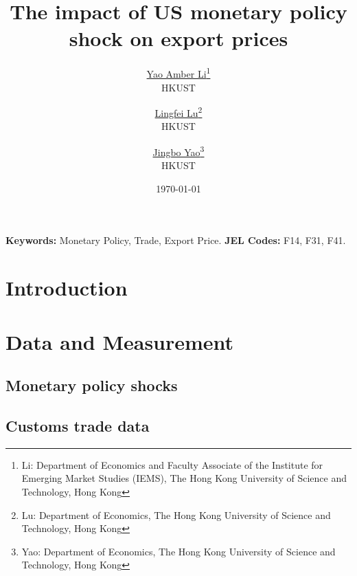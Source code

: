 

\linespread{1.2}
\geometry{a4paper,scale=0.75}
\setlength{\parskip}{0.5em}




\title{\Large \textbf{The impact of US monetary policy shock on export prices}}

\author{\large \href{http://yaoli.people.ust.hk/}{Yao Amber Li}\thanks{Li: Department of Economics and Faculty Associate of the Institute for Emerging Market Studies (IEMS), The Hong Kong University of Science and Technology, Hong Kong}\\ \large{HKUST}
\medskip
\and \href{}{Lingfei Lu}\thanks{Lu: Department of Economics, The Hong Kong University of Science and Technology, Hong Kong } \\ \large{HKUST}
\medskip
\and \href{}{Jingbo Yao}\thanks{Yao: Department of Economics, The Hong Kong University of Science and Technology, Hong Kong} \\ \large{HKUST}
}
\date{\today}

\maketitle

\begin{abstract}


\end{abstract}

\textbf{Keywords:} Monetary Policy, Trade, Export Price.
\textbf{JEL Codes:} F14, F31, F41.
\newpage

\tableofcontents
\newpage

\section{Introduction}

\section{Data and Measurement}

\subsection{Monetary policy shocks}

\subsection{Customs trade data}


